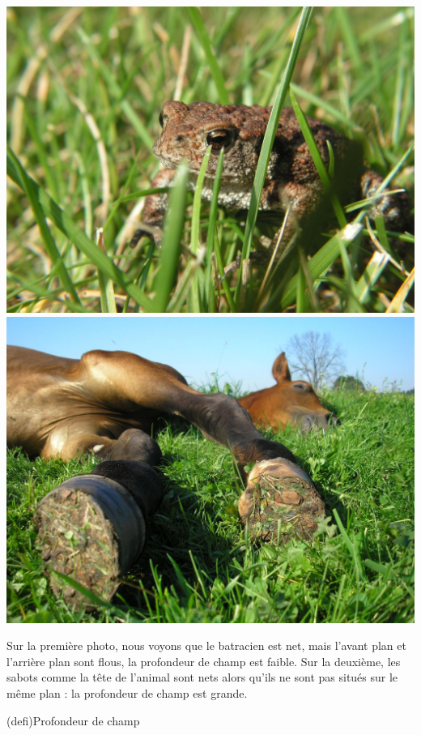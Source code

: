 \documentclass[../../main/main.tex]{subfiles}
\begin{document}
\begin{center}
	\includegraphics[scale=0.12]{photo-pdc-faible.jpg} \qquad
	\includegraphics[scale=0.12]{photo-pdc-eleve.jpg}
\end{center}

Sur la première photo, nous voyons que le batracien est net, mais l'avant plan
et l'arrière plan sont flous, la profondeur de champ est faible. Sur la
deuxième, les sabots comme la tête de l'animal sont nets alors qu'ils ne sont
pas situés sur le même plan : la profondeur de champ est grande.

\begin{tcb*}[label=def:pdc](defi){Profondeur de champ}
\end{tcb*}
\end{document}
